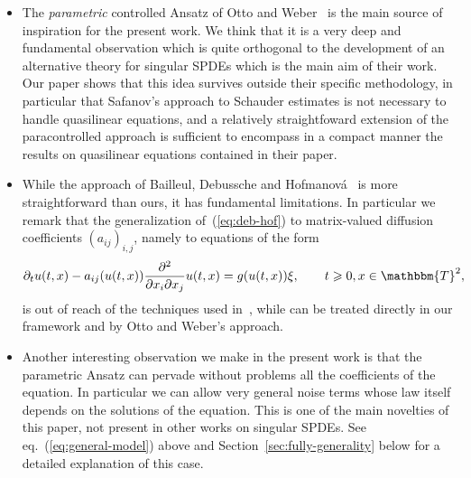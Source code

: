 \documentclass{amsart}
\newcommand{\tmtextit}[1]{{\itshape{#1}}}
\newenvironment{itemizedot}{\begin{itemize} \renewcommand{\labelitemi}{$\bullet$}\renewcommand{\labelitemii}{$\bullet$}\renewcommand{\labelitemiii}{$\bullet$}\renewcommand{\labelitemiv}{$\bullet$}}{\end{itemize}}
\theoremstyle{remark}
\theoremstyle{definition}
\begin{document}
\begin{itemizedot}
  \item The \tmtextit{parametric} controlled Ansatz of Otto and
  Weber~{\cite{otto_quasilinear_2016}} is the main source of inspiration for
  the present work. We think that it is a very deep and fundamental
  observation which is quite orthogonal to the development of an alternative
  theory for singular SPDEs which is the main aim of their work. Our paper
  shows that this idea survives outside their specific methodology, in
  particular that Safanov's approach to Schauder estimates is not necessary to
  handle quasilinear equations, and a relatively straightfoward extension of
  the paracontrolled approach is sufficient to encompass in a compact manner
  the results on quasilinear equations contained in their paper. \
  
  \item While the approach of Bailleul, Debussche and
  Hofmanov{\'a}~{\cite{hofmanova}} is more straightforward than ours, it has
  fundamental limitations. In particular we remark that the generalization
  of~(\ref{eq:deb-hof}) to matrix-valued diffusion coefficients $(a_{i j})_{i,
  j}$, namely to equations of the form
  \begin{equation}
    \partial_t u (t, x) - a_{i j} (u (t, x)) \frac{\partial^2}{\partial x_i
    \partial x_j} u (t, x) = g (u (t, x)) \xi, \qquad t \geqslant 0, x \in
    \mathbbm{T}^2, \label{e:matrix-valued-coeff}
  \end{equation}
  is out of reach of the techniques used in~{\cite{hofmanova}}, while can be
  treated directly in our framework and by Otto and Weber's approach.
  
  \item Another interesting observation we make in the present work is that
  the parametric Ansatz can pervade without problems all the coefficients of
  the equation. In particular we can allow very general noise terms whose law
  itself depends on the solutions of the equation. This is one of the main
  novelties of this paper, not present in other works on singular SPDEs. See
  eq.~(\ref{eq:general-model}) above and Section~\ref{sec:fully-generality}
  below for a detailed explanation of this case.
  

\end{itemizedot}
\end{document}
